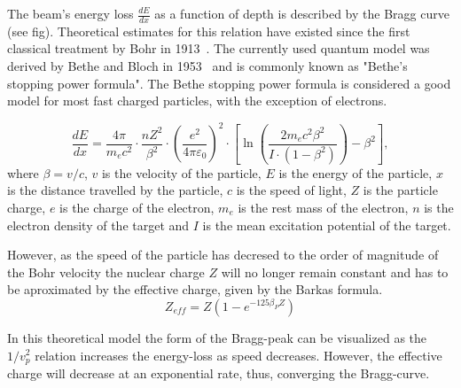 The beam's energy loss $\frac{dE}{dx}$ as a function of depth is described by the Bragg curve (see fig). %
 Theoretical estimates for this relation have existed since the first classical treatment by Bohr in 1913~\cite{bohr13}. The currently used quantum model was derived by Bethe and Bloch in 1953~\cite{bethebloch53}  and is commonly known as "Bethe's stopping power formula". The Bethe stopping power formula is considered a good model for most fast charged particles, with the exception of electrons.

\begin{equation}
 \frac{dE}{dx} = \frac{4 \pi}{m_e c^2} \cdot \frac{nZ^2}{\beta^2} \cdot \left(\frac{e^2}{4\pi\varepsilon_0}\right)^2 \cdot \left[\ln \left(\frac{2m_e c^2 \beta^2}{I \cdot (1-\beta^2)}\right) - \beta^2\right],
\label{bethebloch}
\end{equation}
where $\beta = v/c $, 
$v$ is the velocity of the particle,
$E$ is the 
energy of the particle,
$x$ is the 
distance travelled by the particle,
$c$ is the 
speed of light,
$Z$ is the 
particle charge,
$e$ is the 
charge of the electron,
$m_e$ is the 
rest mass of the electron,
$n$ is the 
electron density of the target and 
$I$  is the 
mean excitation potential of the target.


However, as the speed of the particle has decresed to the order of magnitude of the Bohr velocity the nuclear charge $Z$ will no longer remain constant and has to be aproximated by the effective charge, given by the Barkas formula. $$Z_{eff} = Z(1-e^{-125\beta_{P}Z})$$

In this theoretical model the form of the Bragg-peak can be visualized as the $1/v_{p}^2$ relation increases the energy-loss as speed decreases. However, the effective charge will decrease at an exponential rate, thus, converging the Bragg-curve.

